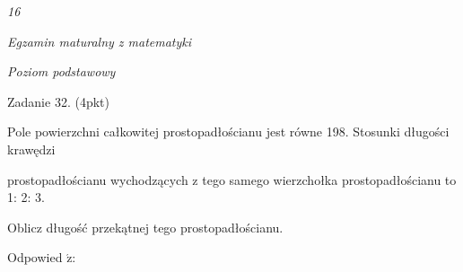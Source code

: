 \documentclass[a4paper,12pt]{article}
\begin{document}
{\it 16}

{\it Egzamin maturalny z matematyki}

{\it Poziom podstawowy}

Zadanie 32. (4pkt)

Pole powierzchni całkowitej prostopadłościanu jest równe 198. Stosunki długości krawędzi

prostopadłościanu wychodzących z tego samego wierzchołka prostopadłościanu to 1: 2: 3.

Oblicz długość przekątnej tego prostopadłościanu.

Odpowied $\acute{\mathrm{z}}$:
\end{document}
